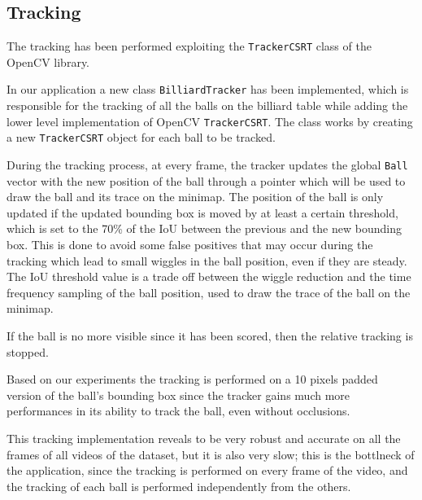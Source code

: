 \subsection{Tracking}
The tracking has been performed exploiting the \texttt{TrackerCSRT} class of the OpenCV library.

In our application a new class \texttt{BilliardTracker} has been implemented, which is responsible for the tracking of all the balls on the billiard table while adding the lower level implementation of OpenCV \texttt{TrackerCSRT}. The class works by creating a new \texttt{TrackerCSRT} object for each ball to be tracked.

During the tracking process, at every frame, the tracker updates the global \texttt{Ball} vector with the new position of the ball through a pointer which will be used to draw the ball and its trace on the minimap.
The position of the ball is only updated if the updated bounding box is moved by at least a certain threshold, which is set to the 70\% of the IoU between the previous and the new bounding box. This is done to avoid some false positives that may occur during the tracking which lead to small wiggles in the ball position, even if they are steady.
The IoU threshold value is a trade off between the wiggle reduction and the time frequency sampling of the ball position, used to draw the trace of the ball on the minimap.

If the ball is no more visible since it has been scored, then the relative tracking is stopped.

Based on our experiments the tracking is performed on a 10 pixels padded version of the ball's bounding box since the tracker gains much more performances in its ability to track the ball, even without occlusions.

This tracking implementation reveals to be very robust and accurate on all the frames of all videos of the dataset, but it is also very slow; this is the bottlneck of the application, since the tracking is performed on every frame of the video, and the tracking of each ball is performed independently from the others.
